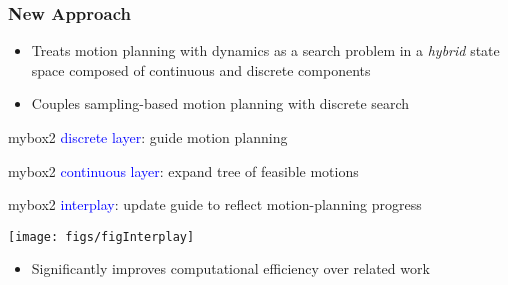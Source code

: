 \documentclass[10pt,t]{beamer}
\begin{document}
\begin{frame}
\frametitle{{\large {New Approach}}}

\begin{itemize}
\item {Treats motion planning with dynamics as a search problem in a \emph{hybrid} state space composed of continuous and discrete components}

\vspace*{4mm}

\item  {Couples sampling-based motion planning with discrete search}
\end{itemize}


\vspace*{4mm}

\begin{beamercolorbox}[ht=2.5ex,dp=1.125ex,center]{mybox2}
{\textcolor{blue}{discrete layer}}: guide motion planning
\end{beamercolorbox}

\begin{beamercolorbox}[ht=2.5ex,dp=1.125ex,center]{mybox2}
{\textcolor{blue}{continuous layer}}: expand tree of feasible motions
\end{beamercolorbox}

\begin{beamercolorbox}[ht=2.5ex,dp=1.125ex,center]{mybox2}
{\textcolor{blue}{interplay}}: update guide to reflect motion-planning progress
\end{beamercolorbox}

\vspace*{2mm}

\centerline{\texttt{[image: figs/figInterplay]}}

\vspace*{2mm}

\begin{itemize}
\item  Significantly improves computational efficiency over related work
\end{itemize}

\end{frame}
\end{document}
